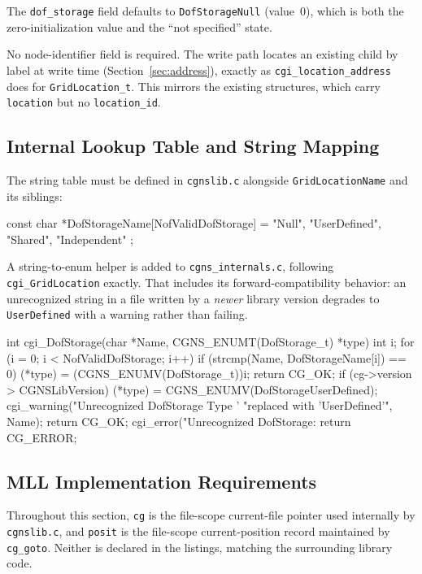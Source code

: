 \documentclass[11pt,letterpaper]{article}
\makeatletter
\let\cgns@orig@lstlisting\lstlisting
\let\cgns@endorig@lstlisting\endlstlisting
\renewenvironment{lstlisting}
  {\par\needspace{5\baselineskip}\nolinenumbers\cgns@orig@lstlisting}
  {\cgns@endorig@lstlisting\par\linenumbers}
\makeatother
\begin{document}
The \texttt{dof\_storage} field defaults to
\texttt{DofStorageNull} (value~0), which is both the
zero-initialization value and the ``not specified'' state.

No node-identifier field is required.  The write path locates an
existing child by label at write time (Section~\ref{sec:address}),
exactly as \texttt{cgi\_location\_address} does for
\texttt{GridLocation\_t}.  This mirrors the existing structures, which
carry \texttt{location} but no \texttt{location\_id}.

\subsection{Internal Lookup Table and String Mapping}

The string table must be defined in \texttt{cgnslib.c} alongside
\texttt{GridLocationName} and its siblings:

\begin{lstlisting}[language=C]
const char *DofStorageName[NofValidDofStorage] = {
    "Null",
    "UserDefined",
    "Shared",
    "Independent"
};
\end{lstlisting}

A string-to-enum helper is added to \texttt{cgns\_internals.c},
following \texttt{cgi\_GridLocation} exactly.  That includes its
forward-compatibility behavior: an unrecognized string in a file
written by a \emph{newer} library version degrades to
\texttt{UserDefined} with a warning rather than failing.

\begin{lstlisting}[language=C]
int cgi_DofStorage(char *Name, CGNS_ENUMT(DofStorage_t) *type)
{
    int i;
    for (i = 0; i < NofValidDofStorage; i++) {
        if (strcmp(Name, DofStorageName[i]) == 0) {
            (*type) = (CGNS_ENUMV(DofStorage_t))i;
            return CG_OK;
        }
    }
    if (cg->version > CGNSLibVersion) {
        (*type) = CGNS_ENUMV(DofStorageUserDefined);
        cgi_warning("Unrecognized DofStorage Type '%s' "
                    "replaced with 'UserDefined'", Name);
        return CG_OK;
    }
    cgi_error("Unrecognized DofStorage: %s", Name);
    return CG_ERROR;
}
\end{lstlisting}

\subsection{MLL Implementation Requirements}
\label{sec:mll-impl}

Throughout this section, \texttt{cg} is the file-scope
current-file pointer used internally by \texttt{cgnslib.c}, and
\texttt{posit} is the file-scope current-position record maintained by
\texttt{cg\_goto}.  Neither is declared in the listings, matching the
surrounding library code.
\end{document}
